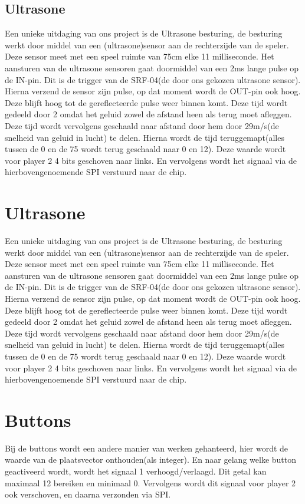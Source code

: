 \documentclass[oneside,dutch]{tudelft-report}
\begin{document}
\subsection{Ultrasone}
Een unieke uitdaging van ons project is de Ultrasone besturing, de besturing werkt door middel van een (ultrasone)sensor aan de rechterzijde van de speler. Deze sensor meet met een speel ruimte van 75cm elke 11 milliseconde. Het aansturen van de ultrasone sensoren gaat doormiddel van een 2ms lange pulse op de IN-pin. Dit is de trigger van de SRF-04(de door ons gekozen ultrasone sensor). Hierna verzend de sensor zijn pulse, op dat moment wordt de OUT-pin ook hoog. Deze blijft hoog tot de gereflecteerde pulse weer binnen komt. Deze tijd wordt gedeeld door 2 omdat het geluid zowel de afstand heen als terug moet afleggen. Deze tijd wordt vervolgens geschaald naar afstand door hem door 29m/s(de snelheid van geluid in lucht) te delen. Hierna wordt de tijd teruggemapt(alles tussen de 0 en de 75 wordt terug geschaald naar 0 en 12). Deze waarde wordt voor player 2 4 bits geschoven naar links. En vervolgens wordt het signaal via de hierbovengenoemende SPI verstuurd naar de chip.

\section{Ultrasone}
Een unieke uitdaging van ons project is de Ultrasone besturing, de besturing werkt door middel van een (ultrasone)sensor aan de rechterzijde van de speler. Deze sensor meet met een speel ruimte van 75cm elke 11 milliseconde. Het aansturen van de ultrasone sensoren gaat doormiddel van een 2ms lange pulse op de IN-pin. Dit is de trigger van de SRF-04(de door ons gekozen ultrasone sensor). Hierna verzend de sensor zijn pulse, op dat moment wordt de OUT-pin ook hoog. Deze blijft hoog tot de gereflecteerde pulse weer binnen komt. Deze tijd wordt gedeeld door 2 omdat het geluid zowel de afstand heen als terug moet afleggen. Deze tijd wordt vervolgens geschaald naar afstand door hem door 29m/s(de snelheid van geluid in lucht) te delen. Hierna wordt de tijd teruggemapt(alles tussen de 0 en de 75 wordt terug geschaald naar 0 en 12). Deze waarde wordt voor player 2 4 bits geschoven naar links. En vervolgens wordt het signaal via de hierbovengenoemende SPI verstuurd naar de chip.

\section{Buttons}
Bij de buttons wordt een andere manier van werken gehanteerd, hier wordt de waarde van de plaatsvector onthouden(als integer). En naar gelang welke button geactiveerd wordt, wordt het signaal 1 verhoogd/verlaagd. Dit getal kan maximaal 12 bereiken en minimaal 0. Vervolgens wordt dit signaal voor player 2 ook verschoven, en daarna verzonden via SPI.
\end{document}
